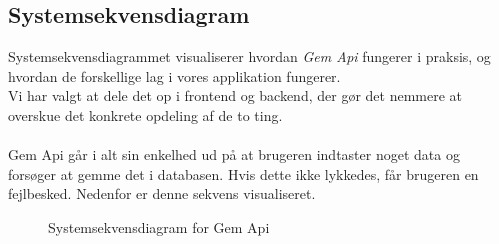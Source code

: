 \subsection{Systemsekvensdiagram}
Systemsekvensdiagrammet visualiserer hvordan \textit{Gem Api} fungerer i praksis, og hvordan de forskellige lag i vores applikation fungerer.
\\
Vi har valgt at dele det op i frontend og backend, der gør det nemmere at overskue det konkrete opdeling af de to ting.
\\\\
Gem Api går i alt sin enkelhed ud på at brugeren indtaster noget data og forsøger at gemme det i databasen.
Hvis dette ikke lykkedes, får brugeren en fejlbesked. Nedenfor er denne sekvens visualiseret.
\begin{figure}[H]
    \caption{Systemsekvensdiagram for Gem Api}
\label{fig:ssd}
\end{figure}
